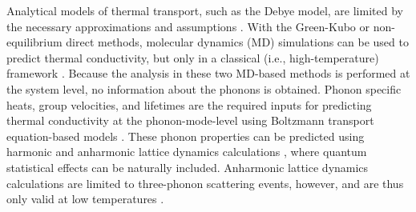 Analytical models of thermal transport, such as the Debye model, are 
limited by
the necessary approximations and assumptions
\cite{callaway_model_1959,holland_analysis_1963,
mcgaughey_size-dependent_2011}. 
With the Green-Kubo or
non-equilibrium direct methods, molecular dynamics (MD) simulations can 
be used to predict thermal
conductivity, but only in a classical (i.e., high-temperature) framework 
\cite{ladd_lattice_1986,mcgaughey_quantitative_2004,landry_complex_2008,
schelling_comparison_2002,sellan_size_2010,esfarjani_heat_2011,
turney_predicting_2009}. 
Because the analysis in these two MD-based methods is performed at the 
system level, 
no information about the phonons is obtained. Phonon specific heats, 
group velocities, 
and lifetimes are the required inputs for predicting thermal 
conductivity at the 
phonon-mode-level using  Boltzmann transport equation-based models 
\cite{ladd_lattice_1986,mcgaughey_quantitative_2004,
mcgaughey_size-dependent_2011,
sellan_size_2010,esfarjani_heat_2011,turney_predicting_2009,
he_thermal_2011}.
These phonon properties can be predicted using harmonic and anharmonic 
lattice dynamics
calculations 
\cite{maradudin_scattering_1962,wallace_thermodynamics_1972,
ladd_lattice_1986,dove_introduction_1993,
turney_predicting_2009,turney_assesing_2009},
 where quantum statistical effects can be naturally included. Anharmonic 
 lattice dynamics 
calculations are limited to three-phonon scattering events, however, and 
are thus only valid at 
low temperatures 
\cite{turney_predicting_2009,esfarjani_heat_2011,
wallace_thermodynamics_1972,srivastava_physics_1990}.

